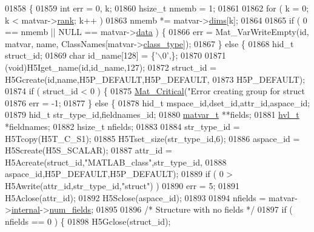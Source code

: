 \begin{DoxyCode}
{{{01858 \{
01859     \textcolor{keywordtype}{int}     err = 0, k;
01860     hsize\_t nmemb = 1;
01861 
01862     \textcolor{keywordflow}{for} ( k = 0; k < matvar->\hyperlink{group___m_a_t_a84ba70c96ded13cc555fa75b768d9921}{rank}; k++ )
01863         nmemb *= matvar->\hyperlink{group___m_a_t_a8e01234e1c862ce3472bb37f5a09b92c}{dims}[k];
01864 
01865     if ( 0 == nmemb || NULL == matvar->\hyperlink{group___m_a_t_a5672978efa230bbdecdf38ede781f7fa}{data} ) \{
01866         err = Mat\_VarWriteEmpty(\textcolor{keywordtype}{id}, matvar, name, ClassNames[matvar->\hyperlink{group___m_a_t_aff13035bf3265dd7d9425e5d40c839d4}{class\_type}]);
01867     \} \textcolor{keywordflow}{else} \{
01868         hid\_t struct\_id;
01869         \textcolor{keywordtype}{char} id\_name[128] = \{\textcolor{charliteral}{'\(\backslash\)0'},\};
01870 
01871         (void)H5Iget\_name(\textcolor{keywordtype}{id},id\_name,127);
01872         struct\_id = H5Gcreate(\textcolor{keywordtype}{id},name,H5P\_DEFAULT,H5P\_DEFAULT,
01873                               H5P\_DEFAULT);
01874         \textcolor{keywordflow}{if} ( struct\_id < 0 ) \{
01875             \hyperlink{group__mat__util_gaf51f2bfbb5580f575e4dd79757e2b80c}{Mat\_Critical}(\textcolor{stringliteral}{"Error creating group for struct %
01876             err = -1;
01877         \} \textcolor{keywordflow}{else} \{
01878             hid\_t mspace\_id,dset\_id,attr\_id,aspace\_id;
01879             hid\_t str\_type\_id,fieldnames\_id;
01880             \hyperlink{group___m_a_t_structmatvar__t}{matvar\_t} **fields;
01881             \hyperlink{structhvl__t}{hvl\_t}     *fieldnames;
01882             hsize\_t    nfields;
01883 
01884             str\_type\_id = H5Tcopy(H5T\_C\_S1);
01885             H5Tset\_size(str\_type\_id,6);
01886             aspace\_id = H5Screate(H5S\_SCALAR);
01887             attr\_id = H5Acreate(struct\_id,\textcolor{stringliteral}{"MATLAB\_class"},str\_type\_id,
01888                                 aspace\_id,H5P\_DEFAULT,H5P\_DEFAULT);
01889             \textcolor{keywordflow}{if} ( 0 > H5Awrite(attr\_id,str\_type\_id,\textcolor{stringliteral}{"struct"}) )
01890                 err = 5;
01891             H5Aclose(attr\_id);
01892             H5Sclose(aspace\_id);
01893 
01894             nfields = matvar->\hyperlink{group___m_a_t_a6e97e3ed9f40c49322c18561c2a94e92}{internal}->\hyperlink{structmatvar__internal_a93fc447484f455eddf9334f2e9e411c2}{num\_fields};
01895 
01896             \textcolor{comment}{/* Structure with no fields */}
01897             \textcolor{keywordflow}{if} ( nfields == 0 ) \{
01898                 H5Gclose(struct\_id);
}}}}
\end{DoxyCode}
